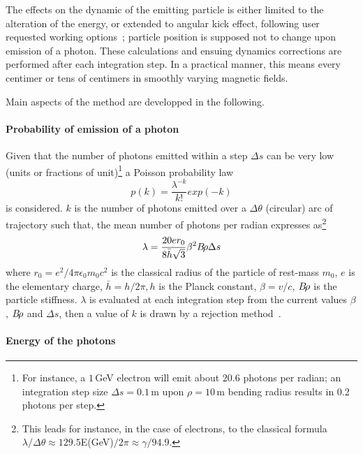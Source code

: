 The effects on the dynamic of the emitting particle 
 is either limited to the alteration of the energy, or extended to angular kick effect, 
following user requested working options~; particle 
position is supposed not to  change upon emission of a photon. These calculations 
 and ensuing dynamics corrections are performed after 
 each integration step. In a practical manner, this 
means every centimer or tens of centimers in smoothly varying magnetic fields. 

Main aspects of the method are developped in the following. 

\paragraph{Probability of emission of a photon}

Given that the number of photons emitted within a step $\Delta s$ can be very low (units or fractions 
of unit)\footnote{For instance, a $1\,$GeV electron will emit about $20.6$ photons per radian; an 
 integration step size $\Delta s =0.1\,$m upon $\rho=10\,$m bending radius results in 0.2 photons 
per step.} a Poisson probability law 
\begin{equation}
	\label{EqPoiss}
 p(k) = \frac{\lambda^{-k}}{k!} exp(-k)
\end{equation}
is considered. $k$ is the number of photons emitted over a $\Delta \theta$ (circular) arc of 
trajectory  such that, the mean number of photons per radian expresses as\footnote{This leads for 
instance, in the case of electrons, to the classical formula $\lambda/\Delta \theta \approx
129.5$E(GeV)$/2\pi\approx \gamma/94.9$.}
\begin{equation}
        \label{EqPoissMean}
 \lambda = \frac{20 e r_0 }{8 \bar{h} \sqrt{3}  } \beta^2 B\!\rho  \Delta s
\end{equation}
where $r_0=e^2/4\pi \epsilon_0 m_0 c^2$ is the classical radius of the particle of rest-mass $m_0$, 
$e$ is the elementary 
charge, $\bar{h} = h/2\pi , h$ is the Planck constant, $\beta = v/c$, $B\!\rho$ is the particle 
stiffness. $\lambda$ is evaluated at each integration step from the current values $\beta$, $B\!\rho$ 
and $\Delta s$,  then a value of $k$ is drawn by a rejection method~\cite[routine POIDEV]{NumRec}.  


\paragraph{Energy of the photons}

